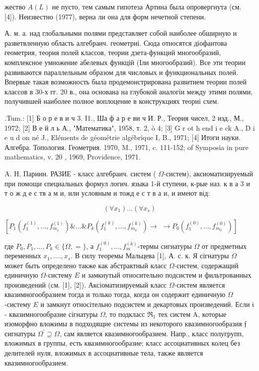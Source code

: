 \documentclass[10pt]{article}
\def\AA{\mathring{\mathrm{A}}}
\begin{document}
жество $A(L)$ не пусто, тем самым гипотеза Артина была опровергнута (см. [4]). Неизвестно (1977), верна ли она для форм нечетной степени.



А. м. а. над глобальными полями представляет собой наиболее обширную и разветвленную область алгебраич. геометриі. Сюда относятся діофантова геометрия, теория полей классов, теории дзета-функций многообразий, комплексное умножение абелевых функцій (Іли многообразий). Все эти теории развиваются параллельным образом для числовых и функциональных полей. Впервые такая возможность была продемонстрирована развитием теории полей классов в 30-х гг. 20 в., она основана на глубокой аналогіи между этими полями, получившей наиболее полное воплоцение в конструкциях теориі схем.



.Tum.: [1] Б о р е в и ч 3. I1., Ша ф а р е ви ч И. Р., Теория чисел, 2 изд., М., 1972; [2] В е й л ь А., "Математика", 1958, т. 2, ò 4; [3] G r ot h end i e ck A., D i e u d on né J., Eléments de géométrie algébrique I, B., 1971; [4] Итоги науки. Алгебра. Топология. Геометрия. 1970, M., 1971, c. 111-152; of Symposia in pure mathematics, v. 20 , 1969, Providence, 1971.



A. H. Париин. РАЗИЕ - класс алгебраич. систем ( $\Omega$-систем), аксиоматизируемый при помощи специальных формул логич. языка 1-й ступени, к-рые наз. к в а 3 и т о ж д е с тв а м и, или условным и тожд е с т в а и, и имеют від:



\[

\left(\forall x_{1}\right) \ldots\left(\forall x_{s}\right)

\]



$\left[P_{1}\left(f_{1}^{(1)}, \ldots, f_{m_{1}}^{(1)}\right) \& \ldots \& P_{k}\left(f_{1}^{(k)}, \ldots, f_{m_{k}}^{(k)}\right) \longrightarrow\right.$ $\left.\longrightarrow P_{0}\left(f_{1}^{(0)}, \ldots, f_{m_{0}}^{(0)}\right)\right]$



где $P_{0}, P_{1}, \ldots, P_{k} \in\{\Omega,=\}$, а $f_{1}^{(0)}, \ldots, f_{m}^{(k)}$-термы сигнатуры $\Omega$ от предметных переменных $x_{1}, \ldots ., x_{s}$. В силу теоремы Мальцева [1], А. с. к. Я сігнатуры $\Omega$ может быть определено также как абстрактный класс $\Omega$-систем, содержащий единичную $\Omega$-систему $E$ и замкнутый относительно подсистем и фильтрованных произведений (см. [1], [2]). Аксіоматизируемый класс $\Omega$-систем является квазимногообразием тогда и только тогда, когда он содержит единичную $\Omega$-систему $E$ и замкнут относітельно подсистем и декартовых произведений. Если $\mathfrak{i}$ - квазимногообразие сігнатуры $\Omega$, то подкласс $\Re_{1}$ тех систем $\AA$, которые изоморфно вложимы в подходящие системы из некоторого квазимногообразия $\mathfrak{f}$ сигнатуры $\Omega^{\prime} \supseteq \Omega$, сам является квазимногообразием. Напр., класс полугрупп, вложимых в группы, есть квазимногообразие; класс ассоциативных колец без делителей нуля, вложимых в ассоциативные тела, также является квазимногообразием.
\end{document}
